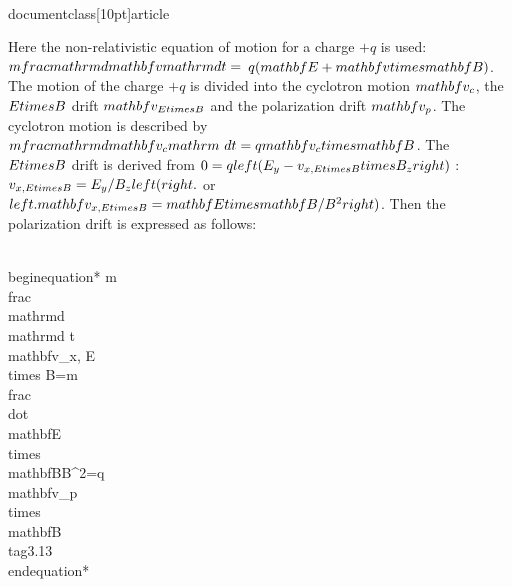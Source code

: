 \\documentclass[10pt]{article}
\begin{document}
Here the non-relativistic equation of motion for a charge $+q$ is used: $m \\frac{\\mathrm{d} \\mathbf{v}}{\\mathrm{d} t}=$ $q(\\mathbf{E}+\\mathbf{v} \\times \\mathbf{B})$. The motion of the charge $+q$ is divided into the cyclotron motion $\\mathbf{v}_{c}$, the $E \\times B$ drift $\\mathbf{v}_{E \\times B}$ and the polarization drift $\\mathbf{v}_{p}$. The cyclotron motion is described by $m \\frac{\\mathrm{d} \\mathbf{v}_{c}}{\\mathrm{~d} t}=q \\mathbf{v}_{c} \\times \\mathbf{B}$. The $E \\times B$ drift is derived from $0=q\\left(E_{y}-v_{x, E \\times B} \\times B_{z}\\right)$ : $v_{x, E \\times B}=E_{y} / B_{z}\\left(\\right.$ or $\\left.\\mathbf{v}_{x, E \\times B}=\\mathbf{E} \\times \\mathbf{B} / B^{2}\\right)$. Then the polarization drift is expressed as follows:


\\begin{equation*}
m \\frac{\\mathrm{d}}{\\mathrm{d} t} \\mathbf{v}_{x, E \\times B}=m \\frac{\\dot{\\mathbf{E}} \\times \\mathbf{B}}{B^{2}}=q \\mathbf{v}_{p} \\times \\mathbf{B} \\tag{3.13}
\\end{equation*}
\end{document}
